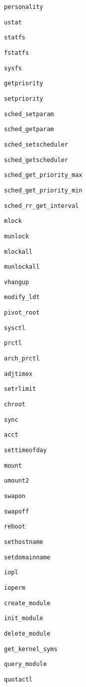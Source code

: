 \verb+personality+

\verb+ustat+

\verb+statfs+

\verb+fstatfs+

\verb+sysfs+

\verb+getpriority+

\verb+setpriority+

\verb+sched_setparam+

\verb+sched_getparam+

\verb+sched_setscheduler+

\verb+sched_getscheduler+

\verb+sched_get_priority_max+

\verb+sched_get_priority_min+

\verb+sched_rr_get_interval+

\verb+mlock+

\verb+munlock+

\verb+mlockall+

\verb+munlockall+

\verb+vhangup+

\verb+modify_ldt+

\verb+pivot_root+

\verb+sysctl+

\verb+prctl+

\verb+arch_prctl+

\verb+adjtimex+

\verb+setrlimit+

\verb+chroot+

\verb+sync+

\verb+acct+

\verb+settimeofday+

\verb+mount+

\verb+umount2+

\verb+swapon+

\verb+swapoff+

\verb+reboot+

\verb+sethostname+

\verb+setdomainname+

\verb+iopl+

\verb+ioperm+

\verb+create_module+

\verb+init_module+

\verb+delete_module+

\verb+get_kernel_syms+

\verb+query_module+

\verb+quotactl+

